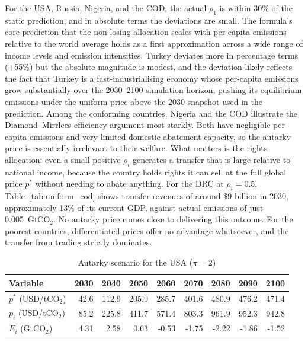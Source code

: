 \documentclass[12pt,english]{article}
\begin{document}
For the USA, Russia, Nigeria, and the COD, the actual $\rho_1$ is within  30\% of the static prediction, and in absolute terms the deviations are small. The formula's core prediction that the non-losing allocation scales with per-capita emissions relative to the world average holds as a first approximation across a wide range of income levels and emission intensities. Turkey deviates more in percentage terms (+55\%) but the absolute magnitude is modest, and the deviation likely reflects the fact that Turkey is a fast-industrialising economy whose per-capita emissions grow substantially over the 2030--2100 simulation horizon, pushing its equilibrium emissions under the uniform price above the 2030 snapshot used in the prediction. Among the conforming countries, Nigeria and the COD illustrate the Diamond--Mirrlees efficiency argument most starkly. Both have negligible per-capita emissions and very limited domestic abatement capacity, so the autarky price is essentially irrelevant to their welfare. What matters is the rights allocation: even a small positive $\rho_i$ generates a transfer that is large relative to national income, because the country holds rights it can sell at the full global price $p^*$ without needing to abate anything. For the DRC at $\rho_i = 0.5$, Table~\ref{tab:uniform_cod} shows transfer revenues of around \$9 billion in 2030, approximately 13\% of its current GDP, against actual emissions of just 0.005~GtCO$_2$. No autarky price comes close to delivering this outcome. For the poorest countries, differentiated prices offer no advantage whatsoever, and the transfer from trading strictly dominates.


\begin{table}[h]
\centering
\caption{Autarky scenario for the USA ($\pi=2$)}
\renewcommand{\arraystretch}{1.2}
\begin{tabular}{lrrrrrrrr}
  \toprule
  \textbf{Variable} & \textbf{2030} & \textbf{2040} & \textbf{2050} & \textbf{2060} & \textbf{2070} & \textbf{2080} & \textbf{2090} & \textbf{2100} \\
  \midrule
  $p^*$ (USD/tCO$_2$) & 42.6 & 112.9 & 205.9 & 285.7 & 401.6 & 480.9 & 476.2 & 471.4 \\
  $p_i$ (USD/tCO$_2$) & 85.2 & 225.8 & 411.7 & 571.4 & 803.3 & 961.9 & 952.3 & 942.8 \\
  $E_i$ (GtCO$_2$) & 4.31 & 2.58 & 0.63 & -0.53 & -1.75 & -2.22 & -1.86 & -1.52 \\
  \bottomrule
  \label{tab:autarky_usa}
\end{tabular}
\end{table}
\end{document}
